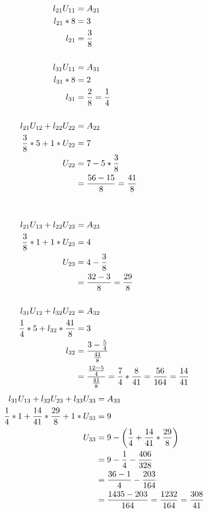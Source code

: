 	\begin{align}
		l_{21}U_{11} &= A_{21}& \notag \\
		l_{21}*8 &= 3& \notag \\
		l_{21} &= \frac{3}{8}& \\
		\notag \\
		l_{31}U_{11} &= A_{31}& \notag \\
		l_{31}*8 &= 2& \notag \\
		l_{31} &= \frac{2}{8} = \frac{1}{4}& \\
		\notag \\
		l_{21}U_{12} + l_{22}U_{22} &= A_{22}& \notag \\
		\frac{3}{8}*5 + 1*U_{22} &= 7& \notag \\
		U_{22} &= 7 - 5*\frac{3}{8}& \notag \\
		&= \frac{56 - 15}{8} = \frac{41}{8}& \\
		\notag \\
		\notag \\
		l_{21}U_{13} + l_{22}U_{23} &= A_{23}& \notag \\
		\frac{3}{8}*1 + 1*U_{23} &= 4& \notag \\
		U_{23} &= 4 - \frac{3}{8}& \notag \\
		&= \frac{32 - 3}{8} = \frac{29}{8}& \\
		\notag \\
		l_{31}U_{12} + l_{32}U_{22} &= A_{32}& \notag \\
		\frac{1}{4}*5 + l_{32}*\frac{41}{8} &= 3& \notag \\
		l_{32} &= \frac{3 - \frac{5}{4}}{\frac{41}{8}}& \notag \\
		&= \frac{\frac{12 - 5}{4}}{\frac{41}{8}} = \frac{7}{4}*\frac{8}{41} = \frac{56}{164} = \frac{14}{41}&
	\end{align}
	\begin{align}
		l_{31}U_{13} + l_{32}U_{23} + l_{33}U_{33} &= A_{33}& \notag \\
		\frac{1}{4}*1 + \frac{14}{41}*\frac{29}{8} + 1*U_{33} &= 9& \notag \\
		U_{33} &= 9 - \left(\frac{1}{4} + \frac{14}{41}*\frac{29}{8}\right)& \notag \\
		&= 9 - \frac{1}{4} - \frac{406}{328}& \notag \\
		&= \frac{36 - 1}{4} - \frac{203}{164}& \notag \\
		&= \frac{1435 - 203}{164} = \frac{1232}{164} = \frac{308}{41}&
	\label{eq:51terms}
	\end{align}

